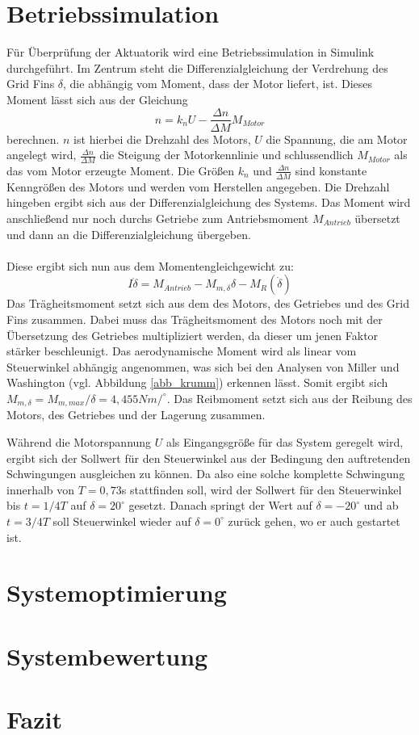 \section{Betriebssimulation}
Für Überprüfung der Aktuatorik wird eine Betriebssimulation in Simulink durchgeführt.
Im Zentrum steht die Differenzialgleichung der Verdrehung des Grid Fins $\delta$, die abhängig vom Moment, dass der Motor liefert, ist. Dieses Moment lässt sich aus der Gleichung
\begin{equation}
	n =k_nU-\frac{\Delta n}{\Delta M}M_{Motor}
\end{equation}
berechnen. $n$ ist hierbei die Drehzahl des Motors, $U$ die Spannung, die am Motor angelegt wird, $\frac{\Delta n}{\Delta M}$ die Steigung der Motorkennlinie und schlussendlich $M_{Motor}$ als das vom Motor erzeugte Moment. Die Größen $k_n$ und $\frac{\Delta n}{\Delta M}$ sind konstante Kenngrößen des Motors und werden vom Herstellen angegeben. Die Drehzahl hingeben ergibt sich aus der Differenzialgleichung des Systems. Das Moment wird anschließend nur noch durchs Getriebe zum Antriebsmoment $M_{Antrieb}$ übersetzt und dann an die Differenzialgleichung übergeben.
\\~\\
Diese ergibt sich nun aus dem Momentengleichgewicht zu:
\begin{equation}
	I\ddot{\delta} = M_{Antrieb} - M_{m, \delta}\delta - M_{R}(\dot{\delta})
\end{equation}
Das Trägheitsmoment setzt sich aus dem des Motors, des Getriebes und des Grid Fins zusammen. Dabei muss das Trägheitsmoment des Motors noch mit der Übersetzung des Getriebes multipliziert werden, da dieser um jenen Faktor stärker beschleunigt. Das aerodynamische Moment wird als linear vom Steuerwinkel abhängig angenommen, was sich bei den Analysen von Miller und Washington \cite{synopsis} (vgl. Abbildung \ref{abb_krumm}) erkennen lässt. Somit ergibt sich $M_{m, \delta} = M_{m, max}/\delta = 4,455Nm/^\circ$. Das Reibmoment setzt sich aus der Reibung des Motors, des Getriebes und der Lagerung zusammen.

Während die Motorspannung $U$ als Eingangsgröße für das System geregelt wird, ergibt sich der Sollwert für den Steuerwinkel aus der Bedingung den auftretenden Schwingungen ausgleichen zu können. Da also eine solche komplette Schwingung innerhalb von $T = 0,73$s stattfinden soll, wird der Sollwert für den Steuerwinkel bis $t = 1/4T$ auf $\delta = 20^\circ$ gesetzt. Danach springt der Wert auf $\delta = -20^\circ$ und ab $t = 3/4T$ soll Steuerwinkel wieder auf $\delta = 0^\circ$ zurück gehen, wo er auch gestartet ist.
\section{Systemoptimierung}

\section{Systembewertung}

\section{Fazit}